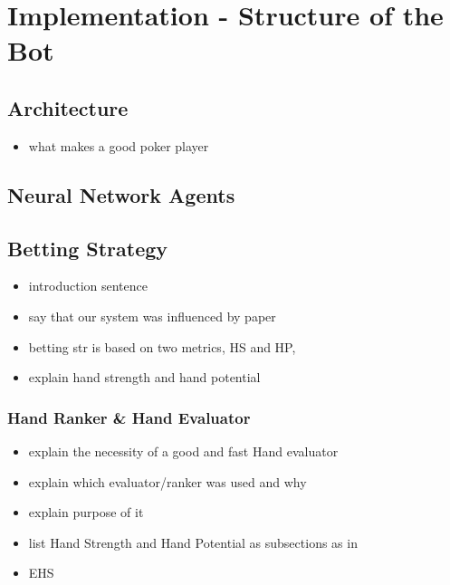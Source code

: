 

\chapter{Implementation - Structure of the Bot}
\label{cha:implementation}
\section{Architecture }
\begin{itemize}
\item what makes a good poker player
\end{itemize}
\section{Neural Network Agents}
\section{Betting Strategy}
\begin{itemize}
\item introduction sentence
\item say that our system was influenced by paper \cite{opp_modeling}
\item betting str is based on two metrics, HS and HP,  
\item explain hand strength and hand potential
\end{itemize}
\subsection{Hand Ranker \& Hand Evaluator}
\begin{itemize}
\item explain the necessity of a good and fast Hand evaluator
\item explain which evaluator/ranker was used and why
\item explain purpose of it
\item list Hand Strength and Hand Potential as subsections as in \cite{opp_master}
\item EHS
\end{itemize}
